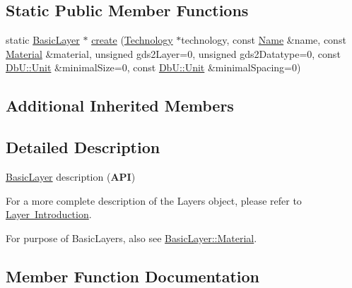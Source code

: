 \subsection*{Static Public Member Functions}
\begin{DoxyCompactItemize}
\item 
static \mbox{\hyperlink{classHurricane_1_1BasicLayer}{Basic\+Layer}} $\ast$ \mbox{\hyperlink{classHurricane_1_1BasicLayer_aecdcb9bef9b3c1c2bcb6d4513e1ca657}{create}} (\mbox{\hyperlink{classHurricane_1_1Technology}{Technology}} $\ast$technology, const \mbox{\hyperlink{classHurricane_1_1Name}{Name}} \&name, const \mbox{\hyperlink{classHurricane_1_1BasicLayer_1_1Material}{Material}} \&material, unsigned gds2\+Layer=0, unsigned gds2\+Datatype=0, const \mbox{\hyperlink{group__DbUGroup_ga4fbfa3e8c89347af76c9628ea06c4146}{Db\+U\+::\+Unit}} \&minimal\+Size=0, const \mbox{\hyperlink{group__DbUGroup_ga4fbfa3e8c89347af76c9628ea06c4146}{Db\+U\+::\+Unit}} \&minimal\+Spacing=0)
\end{DoxyCompactItemize}
\subsection*{Additional Inherited Members}


\subsection{Detailed Description}
\mbox{\hyperlink{classHurricane_1_1BasicLayer}{Basic\+Layer}} description ({\bfseries A\+PI}) 

For a more complete description of the Layers object, please refer to \mbox{\hyperlink{classHurricane_1_1Layer_secLayerIntro}{Layer Introduction}}.

For purpose of Basic\+Layers, also see \mbox{\hyperlink{classHurricane_1_1BasicLayer_1_1Material}{Basic\+Layer\+::\+Material}}. 

\subsection{Member Function Documentation}
\mbox{\label{classHurricane_1_1BasicLayer_aecdcb9bef9b3c1c2bcb6d4513e1ca657}} 
